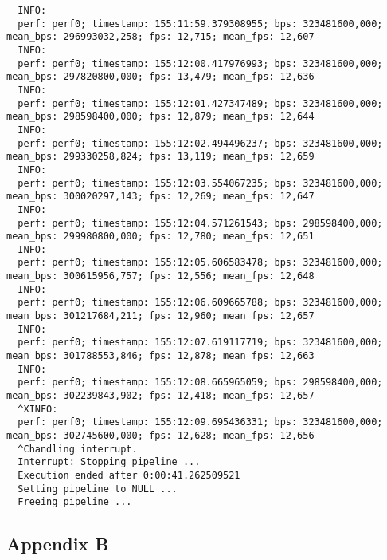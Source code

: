 \documentclass[12pt,oneside]{book}
\begin{document}
\begin{lstlisting}
  INFO:
  perf: perf0; timestamp: 155:11:59.379308955; bps: 323481600,000; mean_bps: 296993032,258; fps: 12,715; mean_fps: 12,607
  INFO:
  perf: perf0; timestamp: 155:12:00.417976993; bps: 323481600,000; mean_bps: 297820800,000; fps: 13,479; mean_fps: 12,636
  INFO:
  perf: perf0; timestamp: 155:12:01.427347489; bps: 323481600,000; mean_bps: 298598400,000; fps: 12,879; mean_fps: 12,644
  INFO:
  perf: perf0; timestamp: 155:12:02.494496237; bps: 323481600,000; mean_bps: 299330258,824; fps: 13,119; mean_fps: 12,659
  INFO:
  perf: perf0; timestamp: 155:12:03.554067235; bps: 323481600,000; mean_bps: 300020297,143; fps: 12,269; mean_fps: 12,647
  INFO:
  perf: perf0; timestamp: 155:12:04.571261543; bps: 298598400,000; mean_bps: 299980800,000; fps: 12,780; mean_fps: 12,651
  INFO:
  perf: perf0; timestamp: 155:12:05.606583478; bps: 323481600,000; mean_bps: 300615956,757; fps: 12,556; mean_fps: 12,648
  INFO:
  perf: perf0; timestamp: 155:12:06.609665788; bps: 323481600,000; mean_bps: 301217684,211; fps: 12,960; mean_fps: 12,657
  INFO:
  perf: perf0; timestamp: 155:12:07.619117719; bps: 323481600,000; mean_bps: 301788553,846; fps: 12,878; mean_fps: 12,663
  INFO:
  perf: perf0; timestamp: 155:12:08.665965059; bps: 298598400,000; mean_bps: 302239843,902; fps: 12,418; mean_fps: 12,657
  ^XINFO:
  perf: perf0; timestamp: 155:12:09.695436331; bps: 323481600,000; mean_bps: 302745600,000; fps: 12,628; mean_fps: 12,656
  ^Chandling interrupt.
  Interrupt: Stopping pipeline ...
  Execution ended after 0:00:41.262509521
  Setting pipeline to NULL ...
  Freeing pipeline ...  
\end{lstlisting}

\subsection*{Appendix B}
\end{document}
